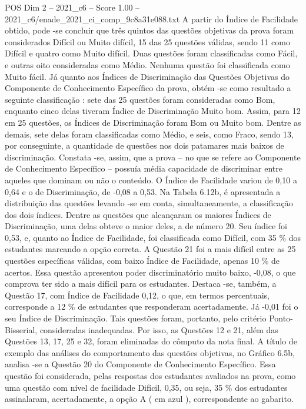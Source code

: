 \begin{textsample}{POS Dim 2 – 2021\_c6 – Score 1.00 – 2021\_c6/enade\_2021\_ci\_comp\_9c8a31e088.txt}
A partir do Índice de Facilidade obtido, pode -se concluir que três quintos das questões objetivas da prova foram considerados Difícil ou Muito difícil, 15 das 25 questões válidas, sendo 11 como Difícil e quatro como Muito difícil.
Duas questões foram classificadas como Fácil, e outras oito consideradas como Médio.
Nenhuma questão foi classificada como Muito fácil.
Já quanto aos Índices de Discriminação das Questões Objetivas do Componente de Conhecimento Específico da prova, obtém -se como resultado a seguinte classificação : sete das 25 questões foram consideradas como Bom, enquanto cinco delas tiveram Índice de Discriminação Muito bom.
Assim, para 12 em 25 questões, os Índices de Discriminação foram Bom ou Muito bom.
Dentre as demais, sete delas foram classificadas como Médio, e seis, como Fraco, sendo 13, por conseguinte, a quantidade de questões nos dois patamares mais baixos de discriminação.
Constata -se, assim, que a prova – no que se refere ao Componente de Conhecimento Específico – possuía média capacidade de discriminar entre aqueles que dominam ou não o conteúdo.
O Índice de Facilidade variou de 0,10 a 0,64 e o de Discriminação, de -0,08 a 0,53.
Na Tabela 6.12b, é apresentada a distribuição das questões levando -se em conta, simultaneamente, a classificação dos dois índices.
Dentre as questões que alcançaram os maiores Índices de Discriminação, uma delas obteve o maior deles, a de número 20.
Seu índice foi 0,53, e, quanto ao Índice de Facilidade, foi classificada como Difícil, com 35 \% dos estudantes marcando a opção correta.
A Questão 21 foi a mais difícil entre as 25 questões específicas válidas, com baixo Índice de Facilidade, apenas 10 \% de acertos.
Essa questão apresentou poder discriminatório muito baixo, -0,08, o que comprova ter sido a mais difícil para os estudantes.
Destaca -se, também, a Questão 17, com Índice de Facilidade 0,12, o que, em termos percentuais, corresponde a 12 \% de estudantes que responderam acertadamente.
Já -0,01 foi o seu Índice de Discriminação.
Tais questões foram, portanto, pelo critério Ponto-Bisserial, consideradas inadequadas.
Por isso, as Questões 12 e 21, além das Questões 13, 17, 25 e 32, foram eliminadas do cômputo da nota final.
A título de exemplo das análises do comportamento das questões objetivas, no Gráfico 6.5b, analisa -se a Questão 20 do Componente de Conhecimento Específico.
Essa questão foi considerada, pelas respostas dos estudantes avaliados na prova, como uma questão com nível de facilidade Difícil, 0,35, ou seja, 35 \% dos estudantes assinalaram, acertadamente, a opção A ( em azul ), correspondente ao gabarito.

\end{textsample}
